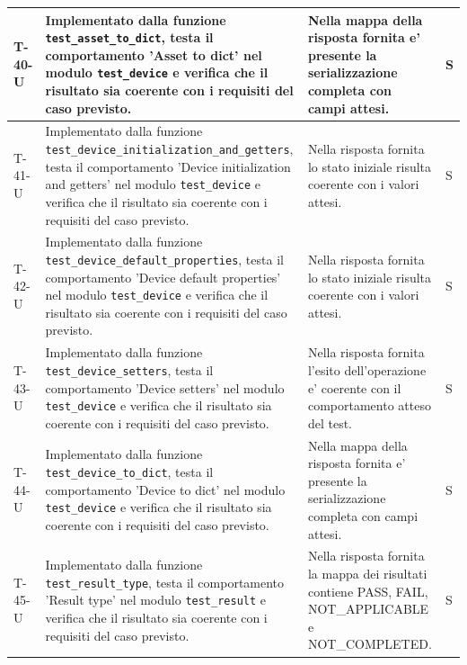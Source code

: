 \documentclass[a4paper,12pt]{article}
\begin{document}
{{\begin{longtable}{|>{\RaggedRight\arraybackslash}p{1.55cm}|>{\RaggedRight\arraybackslash}p{8.0cm}|>{\RaggedRight\arraybackslash}p{4.6cm}|>{\RaggedRight\arraybackslash}p{1.2cm}|}
        \hline
        T-40-U & Implementato dalla funzione \texttt{test\_\allowbreak asset\_\allowbreak to\_\allowbreak dict}, testa il comportamento 'Asset to dict' nel modulo \texttt{test\_\allowbreak device} e verifica che il risultato sia coerente con i requisiti del caso previsto. & Nella mappa della risposta fornita e' presente la serializzazione completa con campi attesi. & S \\
        \hline
        T-41-U & Implementato dalla funzione \texttt{test\_\allowbreak device\_\allowbreak initialization\_\allowbreak and\_\allowbreak getters}, testa il comportamento 'Device initialization and getters' nel modulo \texttt{test\_\allowbreak device} e verifica che il risultato sia coerente con i requisiti del caso previsto. & Nella risposta fornita lo stato iniziale risulta coerente con i valori attesi. & S \\
        \hline
        T-42-U & Implementato dalla funzione \texttt{test\_\allowbreak device\_\allowbreak default\_\allowbreak properties}, testa il comportamento 'Device default properties' nel modulo \texttt{test\_\allowbreak device} e verifica che il risultato sia coerente con i requisiti del caso previsto. & Nella risposta fornita lo stato iniziale risulta coerente con i valori attesi. & S \\
        \hline
        T-43-U & Implementato dalla funzione \texttt{test\_\allowbreak device\_\allowbreak setters}, testa il comportamento 'Device setters' nel modulo \texttt{test\_\allowbreak device} e verifica che il risultato sia coerente con i requisiti del caso previsto. & Nella risposta fornita l'esito dell'operazione e' coerente con il comportamento atteso del test. & S \\
        \hline
        T-44-U & Implementato dalla funzione \texttt{test\_\allowbreak device\_\allowbreak to\_\allowbreak dict}, testa il comportamento 'Device to dict' nel modulo \texttt{test\_\allowbreak device} e verifica che il risultato sia coerente con i requisiti del caso previsto. & Nella mappa della risposta fornita e' presente la serializzazione completa con campi attesi. & S \\
        \hline
        T-45-U & Implementato dalla funzione \texttt{test\_\allowbreak result\_\allowbreak type}, testa il comportamento 'Result type' nel modulo \texttt{test\_\allowbreak result} e verifica che il risultato sia coerente con i requisiti del caso previsto. & Nella risposta fornita la mappa dei risultati contiene PASS, FAIL, NOT\_APPLICABLE e NOT\_COMPLETED. & S \\

\end{longtable}}}
\end{document}
